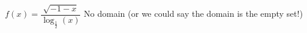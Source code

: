 {$f(x) = \dfrac{\sqrt{-1 - x}}{\log_{\frac{1}{2}} (x)}$}
{No domain (or we could say the domain is the empty set!)}


